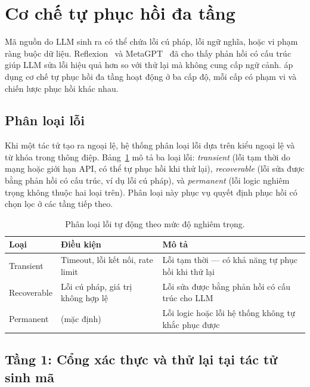 \section{Cơ chế tự phục hồi đa tầng}
\label{sec:self-recovery}

Mã nguồn do LLM sinh ra có thể chứa lỗi cú pháp, lỗi ngữ nghĩa, hoặc vi phạm ràng buộc dữ liệu. Reflexion~\cite{shinn2023reflexion} và MetaGPT~\cite{hong2023metagpt} đã cho thấy phản hồi có cấu trúc giúp LLM sửa lỗi hiệu quả hơn so với thử lại mà không cung cấp ngữ cảnh. \tool áp dụng cơ chế tự phục hồi đa tầng hoạt động ở ba cấp độ, mỗi cấp có phạm vi và chiến lược phục hồi khác nhau.

\subsection{Phân loại lỗi}

Khi một tác tử tạo ra ngoại lệ, hệ thống phân loại lỗi dựa trên kiểu ngoại lệ và từ khóa trong thông điệp. Bảng~\ref{tab:error-taxonomy} mô tả ba loại lỗi: \textit{transient} (lỗi tạm thời do mạng hoặc giới hạn API, có thể tự phục hồi khi thử lại), \textit{recoverable} (lỗi sửa được bằng phản hồi có cấu trúc, ví dụ lỗi cú pháp), và \textit{permanent} (lỗi logic nghiêm trọng không thuộc hai loại trên). Phân loại này phục vụ quyết định phục hồi có chọn lọc ở các tầng tiếp theo.

\begin{table}[htbp]
\centering
\caption{Phân loại lỗi tự động theo mức độ nghiêm trọng.}
\label{tab:error-taxonomy}
\begin{tabular}{lp{4cm}p{6cm}}
\toprule
\textbf{Loại} & \textbf{Điều kiện} & \textbf{Mô tả} \\
\midrule
Transient   & Timeout, lỗi kết nối, rate limit & Lỗi tạm thời --- có khả năng tự phục hồi khi thử lại \\
Recoverable & Lỗi cú pháp, giá trị không hợp lệ & Lỗi sửa được bằng phản hồi có cấu trúc cho LLM \\
Permanent   & (mặc định) & Lỗi logic hoặc lỗi hệ thống không tự khắc phục được \\
\bottomrule
\end{tabular}
\end{table}

\subsection{Tầng 1: Cổng xác thực và thử lại tại tác tử sinh mã}

